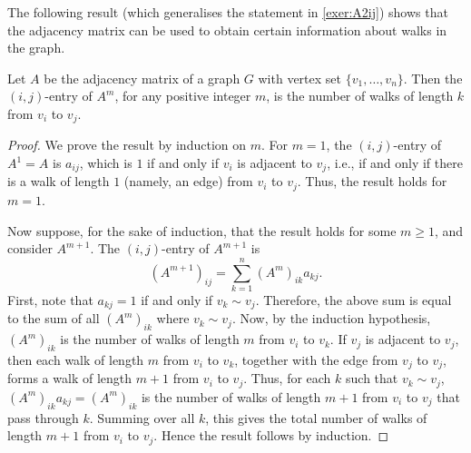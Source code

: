 The following result (which generalises the statement in \cref{exer:A2ij}) shows that the adjacency matrix can be used to obtain certain information about walks in the graph.

\begin{Theorem}
Let $A$ be the adjacency matrix of a graph $G$ with vertex set $\{v_1, \ldots, v_n\}$. Then the $(i,j)$-entry of $A^m$, for any positive integer $m$, is the number of walks of length $k$ from $v_i$ to $v_j$.
\end{Theorem}

\begin{proof}
We prove the result by induction on $m$. For $m = 1$, the $(i,j)$-entry of $A^1 = A$ is $a_{ij}$, which is $1$ if and only if $v_i$ is adjacent to $v_j$, i.e., if and only if there is a walk of length $1$ (namely, an edge) from $v_i$ to $v_j$. Thus, the result holds for $m = 1$.

Now suppose, for the sake of induction, that the result holds for some $m \ge 1$, and consider $A^{m + 1}$. The $(i,j)$-entry of $A^{m + 1}$ is
\begin{equation*}
(A^{m + 1})_{ij} = \sum_{k = 1}^{n} (A^m)_{ik} a_{kj}.
\end{equation*}
First, note that $a_{kj} = 1$ if and only if $v_k \sim v_j$. Therefore, the above sum is equal to the sum of all $(A^m)_{ik}$ where $v_k \sim v_j$. Now, by the induction hypothesis, $(A^m)_{ik}$ is the number of walks of length $m$ from $v_i$ to $v_k$. If $v_j$ is adjacent to $v_j$, then each walk of length $m$ from $v_i$ to $v_k$, together with the edge from $v_j$ to $v_j$, forms a walk of length $m + 1$ from $v_i$ to $v_j$. Thus, for each $k$ such that $v_k \sim v_j$, $(A^m)_{ik} a_{kj} = (A^m)_{ik}$ is the number of walks of length $m + 1$ from $v_i$ to $v_j$ that pass through $k$. Summing over all $k$, this gives the total number of walks of length $m + 1$ from $v_i$ to $v_j$. Hence the result follows by induction.
\end{proof}

%
